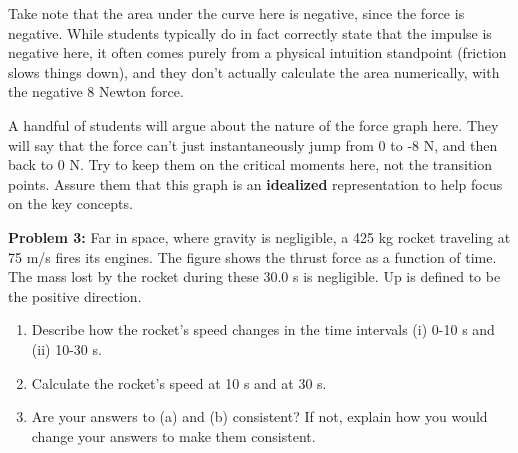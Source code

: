 \begin{tutorialbox}[title = Student Issue: Negative Area]
Take note that the area under the curve here is negative, since the force is negative. 
While students typically do in fact correctly state that the impulse is negative here, it often
comes purely from a physical intuition standpoint (friction slows things down), and they don't actually calculate the area numerically,
with the negative 8 Newton force.
\end{tutorialbox}
\begin{tutorialbox}[title = Student Issue: Step Functions]
    A handful of students will argue about the nature of the force graph here.  They will say that
    the force can't just instantaneously jump from 0 to -8 N, and then back to 0 N.  Try to keep
    them on the critical moments here, not the transition points. Assure them that this graph is an
    \textbf{idealized} representation to help focus on the key concepts.
\end{tutorialbox}

\newpage

\noindent
\textbf{Problem 3:} Far in space, where gravity is negligible, a 425 kg rocket traveling 
at 75 m/s fires its engines. The figure shows the thrust force as a function of time. 
The mass lost by the rocket during these 30.0 s is negligible. Up is defined to be the 
positive direction.

\begin{enumerate}[label=(\alph*)]
    \item Describe how the rocket's speed changes in the time intervals (i) 0-10 s and (ii) 10-30 s.
    \item Calculate the rocket's speed at 10 s and at 30 s.
    \item Are your answers to (a) and (b) consistent? If not, explain how you would change your answers to make them consistent.
\end{enumerate}

\begin{center}
\end{center}

